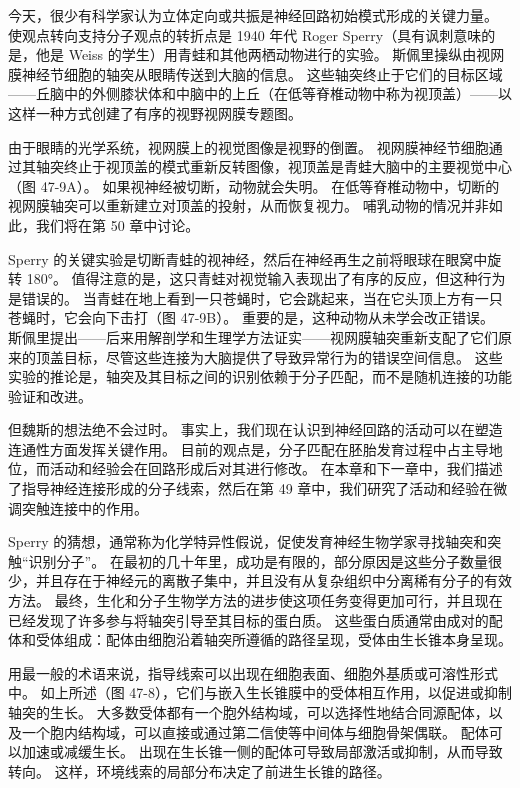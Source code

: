 今天，很少有科学家认为立体定向或共振是神经回路初始模式形成的关键力量。 使观点转向支持分子观点的转折点是 1940 年代 Roger Sperry（具有讽刺意味的是，他是 Weiss 的学生）用青蛙和其他两栖动物进行的实验。 斯佩里操纵由视网膜神经节细胞的轴突从眼睛传送到大脑的信息。 这些轴突终止于它们的目标区域——丘脑中的外侧膝状体和中脑中的上丘（在低等脊椎动物中称为视顶盖）——以这样一种方式创建了有序的视野视网膜专题图。

由于眼睛的光学系统，视网膜上的视觉图像是视野的倒置。 视网膜神经节细胞通过其轴突终止于视顶盖的模式重新反转图像，视顶盖是青蛙大脑中的主要视觉中心（图 47-9A）。 如果视神经被切断，动物就会失明。 在低等脊椎动物中，切断的视网膜轴突可以重新建立对顶盖的投射，从而恢复视力。 哺乳动物的情况并非如此，我们将在第 50 章中讨论。

Sperry 的关键实验是切断青蛙的视神经，然后在神经再生之前将眼球在眼窝中旋转 180°。 值得注意的是，这只青蛙对视觉输入表现出了有序的反应，但这种行为是错误的。 当青蛙在地上看到一只苍蝇时，它会跳起来，当在它头顶上方有一只苍蝇时，它会向下击打（图 47-9B）。 重要的是，这种动物从未学会改正错误。 斯佩里提出——后来用解剖学和生理学方法证实——视网膜轴突重新支配了它们原来的顶盖目标，尽管这些连接为大脑提供了导致异常行为的错误空间信息。 这些实验的推论是，轴突及其目标之间的识别依赖于分子匹配，而不是随机连接的功能验证和改进。

但魏斯的想法绝不会过时。 事实上，我们现在认识到神经回路的活动可以在塑造连通性方面发挥关键作用。 目前的观点是，分子匹配在胚胎发育过程中占主导地位，而活动和经验会在回路形成后对其进行修改。 在本章和下一章中，我们描述了指导神经连接形成的分子线索，然后在第 49 章中，我们研究了活动和经验在微调突触连接中的作用。

Sperry 的猜想，通常称为化学特异性假说，促使发育神经生物学家寻找轴突和突触“识别分子”。 在最初的几十年里，成功是有限的，部分原因是这些分子数量很少，并且存在于神经元的离散子集中，并且没有从复杂组织中分离稀有分子的有效方法。 最终，生化和分子生物学方法的进步使这项任务变得更加可行，并且现在已经发现了许多参与将轴突引导至其目标的蛋白质。 这些蛋白质通常由成对的配体和受体组成：配体由细胞沿着轴突所遵循的路径呈现，受体由生长锥本身呈现。

用最一般的术语来说，指导线索可以出现在细胞表面、细胞外基质或可溶性形式中。 如上所述（图 47-8），它们与嵌入生长锥膜中的受体相互作用，以促进或抑制轴突的生长。 大多数受体都有一个胞外结构域，可以选择性地结合同源配体，以及一个胞内结构域，可以直接或通过第二信使等中间体与细胞骨架偶联。 配体可以加速或减缓生长。 出现在生长锥一侧的配体可导致局部激活或抑制，从而导致转向。 这样，环境线索的局部分布决定了前进生长锥的路径。

